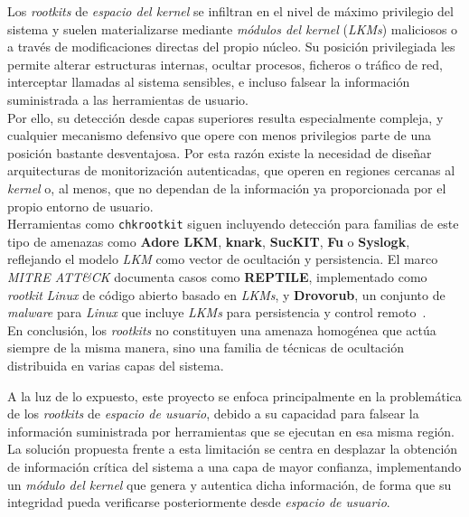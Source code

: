 Los \textit{rootkits} de \textit{espacio del kernel} se infiltran en el nivel de máximo privilegio del sistema y suelen materializarse mediante \textit{módulos del kernel} (\textit{LKMs}) maliciosos o a través de modificaciones directas del propio núcleo.
Su posición privilegiada les permite alterar estructuras internas, ocultar procesos, ficheros o tráfico de red, interceptar llamadas al sistema sensibles, e incluso falsear la información suministrada a las herramientas de usuario.\\

Por ello, su detección desde capas superiores resulta especialmente compleja, y cualquier mecanismo defensivo que opere con menos privilegios parte de una posición bastante desventajosa.
Por esta razón existe la necesidad de diseñar arquitecturas de monitorización autenticadas, que operen en regiones cercanas al \textit{kernel} o, al menos, que no dependan de la información ya proporcionada por el propio entorno de usuario.\\

Herramientas como \texttt{chkrootkit} siguen incluyendo detección para familias de este tipo de amenazas como \textbf{Adore LKM}, \textbf{knark}, \textbf{SucKIT}, \textbf{Fu} o \textbf{Syslogk}, reflejando el modelo \textit{LKM} como vector de ocultación y persistencia.
El marco \textit{MITRE ATT\&CK} documenta casos como \textbf{REPTILE}, implementado como \textit{rootkit} \textit{Linux} de código abierto basado en \textit{LKMs}, y \textbf{Drovorub}, un conjunto de \textit{malware} para \textit{Linux} que incluye \textit{LKMs} para persistencia y control remoto~\cite{chkrootkit_man}.\\


En conclusión, los \textit{rootkits} no constituyen una amenaza homogénea que actúa siempre de la misma manera, sino una familia de técnicas de ocultación distribuida en varias capas del sistema.\\

\newpage

A la luz de lo expuesto, este proyecto se enfoca principalmente en la problemática de los \textit{rootkits} de \textit{espacio de usuario}, debido a su capacidad para falsear la información suministrada por herramientas que se ejecutan en esa misma región.
La solución propuesta frente a esta limitación se centra en desplazar la obtención de información crítica del sistema a una capa de mayor confianza, implementando un \textit{módulo del kernel} que genera y autentica dicha información, de forma que su integridad pueda verificarse posteriormente desde \textit{espacio de usuario}.
